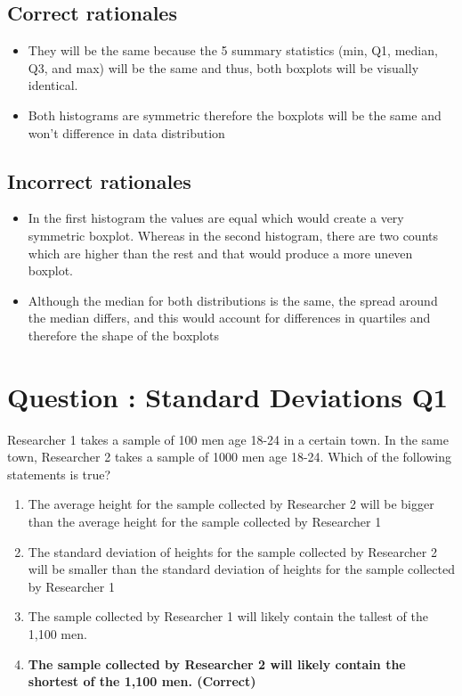 \documentclass[letterpaper,9pt,twoside,printwatermark=false]{pinp}
\providecommand{\tightlist}{%
  \setlength{\itemsep}{0pt}\setlength{\parskip}{0pt}}
\begin{document}
\hypertarget{correct-rationales-2}{%
\subsection{Correct rationales}\label{correct-rationales-2}}

\begin{itemize}
\tightlist
\item
  They will be the same because the 5 summary statistics (min, Q1,
  median, Q3, and max) will be the same and thus, both boxplots will be
  visually identical.
\item
  Both histograms are symmetric therefore the boxplots will be the same
  and won't difference in data distribution
\end{itemize}

\hypertarget{incorrect-rationales-2}{%
\subsection{Incorrect rationales}\label{incorrect-rationales-2}}

\begin{itemize}
\tightlist
\item
  In the first histogram the values are equal which would create a very
  symmetric boxplot. Whereas in the second histogram, there are two
  counts which are higher than the rest and that would produce a more
  uneven boxplot.
\item
  Although the median for both distributions is the same, the spread
  around the median differs, and this would account for differences in
  quartiles and therefore the shape of the boxplots
\end{itemize}

\hypertarget{question-standard-deviations-q1}{%
\section{Question : Standard Deviations
Q1}\label{question-standard-deviations-q1}}

Researcher 1 takes a sample of 100 men age 18-24 in a certain town. In
the same town, Researcher 2 takes a sample of 1000 men age 18-24. Which
of the following statements is true?

\begin{enumerate}
\def\labelenumi{\alph{enumi})}
\tightlist
\item
  The average height for the sample collected by Researcher 2 will be
  bigger than the average height for the sample collected by Researcher
  1
\item
  The standard deviation of heights for the sample collected by
  Researcher 2 will be smaller than the standard deviation of heights
  for the sample collected by Researcher 1
\item
  The sample collected by Researcher 1 will likely contain the tallest
  of the 1,100 men.
\item
  \textbf{The sample collected by Researcher 2 will likely contain the
  shortest of the 1,100 men. (Correct)}
\end{enumerate}
\end{document}

